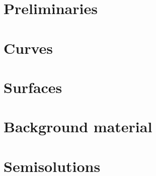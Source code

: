 \documentclass[twoside]{book}
\begin{document}


\part{Preliminaries}

\part{Curves}






\part{Surfaces}


   

%
%


%

%
%

\part{Background material}

\appendix


\part{Semisolutions}




\sloppy
\printbibliography[heading=bibintoc]
\fussy
\end{document}
